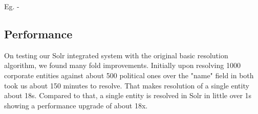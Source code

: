     Eg. - 
\subsection{Performance}
    On testing our Solr integrated system with the original basic resolution algorithm, we found many fold improvements. Initially upon resolving 1000 corporate entities against about 500 political ones over the "name" field in both took us about 150 minutes to resolve. That makes resolution of a single entity about 18s.
    Compared to that, a single entity is resolved in Solr in little over 1s showing a performance upgrade of about 18x.

